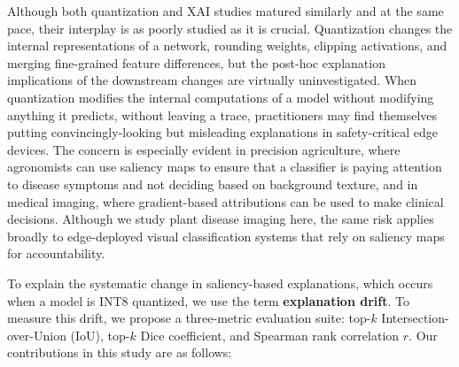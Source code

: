 \documentclass[fleqn,10pt]{wlscirep}
\begin{document}
Although both quantization and XAI studies matured similarly and at the same pace, their interplay is as poorly studied as it is crucial. Quantization changes the internal representations of a network, rounding weights, clipping activations, and merging fine-grained feature differences, but the post-hoc explanation implications of the downstream changes are virtually uninvestigated. When quantization modifies the internal computations of a model without modifying anything it predicts, without leaving a trace, practitioners may find themselves putting convincingly-looking but misleading explanations in safety-critical edge devices. The concern is especially evident in precision agriculture, where agronomists can use saliency maps to ensure that a classifier is paying attention to disease symptoms and not deciding based on background texture, and in medical imaging, where gradient-based attributions can be used to make clinical decisions. Although we study plant disease imaging here, the same risk applies broadly to edge-deployed visual classification systems that rely on saliency maps for accountability.

To explain the systematic change in saliency-based explanations, which occurs when a model is INT8 quantized, we use the term \textbf{explanation drift}. To measure this drift, we propose a three-metric evaluation suite: top-$k$ Intersection-over-Union (IoU), top-$k$ Dice coefficient, and Spearman rank correlation $r$. Our contributions in this study are as follows:
\end{document}
